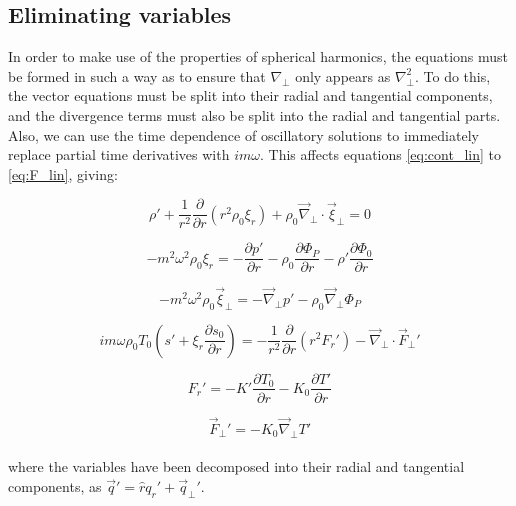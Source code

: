 \documentclass[11pt]{amsart}
\begin{document}
\subsection{Eliminating variables}

In order to make use of the properties of spherical harmonics, the equations must be formed in such a way as to ensure that
$\nabla_{\perp}$ only appears as $\nabla_{\perp}^{2}$.  To do this, the vector equations must be split into their radial and tangential components,
and the divergence terms must also be split into the radial and tangential parts.  Also, we can use the time dependence of oscillatory solutions to immediately
replace partial time derivatives with $i m \omega$.
This affects equations \ref{eq:cont_lin} to \ref{eq:F_lin}, giving:

\begin{equation} \label{eq:cont_split}
\rho' + \frac{1}{r^{2}} \frac{\partial}{\partial r} ( r^{2} \rho_{0} \xi_{r} ) + \rho_{0} \vec{\nabla}_{\perp} \cdot \vec{\xi}_{\perp} = 0
\end{equation}

\begin{equation} \label{eq:mom_split_rad}
- m^{2} \omega^{2} \rho_{0} \xi_{r} = - \frac{\partial p'}{\partial r} - \rho_{0} \frac{\partial \Phi_{P}}{\partial r} 
- \rho' \frac{\partial \Phi_{0}}{\partial r}
\end{equation}

\begin{equation} \label{eq:mom_split_tan}
- m^{2} \omega^{2} \rho_{0} \vec{\xi}_{\perp} = - \vec{\nabla}_{\perp} p' - \rho_{0} \vec{\nabla}_{\perp} \Phi_{P} 
\end{equation}

\begin{equation} \label{eq:E_split}
i m \omega \rho_{0} T_{0} \left( s' + \xi_{r} \frac{\partial s_{0}}{\partial r} \right)
= - \frac{1}{r^{2}} \frac{\partial}{\partial r} ( r^{2} F_{r}') - \vec{\nabla}_{\perp} \cdot \vec{F}_{\perp}'
\end{equation}

\begin{equation} \label{eq:F_split_rad}
F_{r}' = - K' \frac{\partial T_{0}}{\partial r} - K_{0} \frac{\partial T'}{\partial r}
\end{equation}

\begin{equation} \label{eq:F_split_tan}
\vec{F}_{\perp}' = - K_{0} \vec{\nabla}_{\perp} T'
\end{equation}
\\
where the variables have been decomposed into their radial and tangential components, as $\vec{q}' = \hat{r} q_{r}' + \vec{q}_{\perp}'$.
\end{document}
